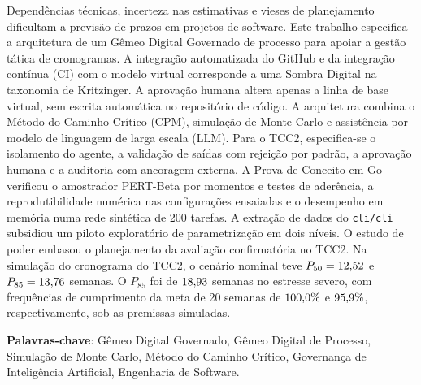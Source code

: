 \documentclass[12pt,openany,oneside,a4paper,english,brazilian,sumario=tradicional]{abntex2}
\begin{document}
\begin{resumo}
Dependências técnicas, incerteza nas estimativas e vieses de planejamento dificultam a previsão de prazos em projetos de software. Este trabalho especifica a arquitetura de um Gêmeo Digital Governado de processo para apoiar a gestão tática de cronogramas. A integração automatizada do GitHub e da integração contínua (CI) com o modelo virtual corresponde a uma Sombra Digital na taxonomia de Kritzinger. A aprovação humana altera apenas a linha de base virtual, sem escrita automática no repositório de código. A arquitetura combina o Método do Caminho Crítico (CPM), simulação de Monte Carlo e assistência por modelo de linguagem de larga escala (LLM). Para o TCC2, especifica-se o isolamento do agente, a validação de saídas com rejeição por padrão, a aprovação humana e a auditoria com ancoragem externa. A Prova de Conceito em Go verificou o amostrador PERT-Beta por momentos e testes de aderência, a reprodutibilidade numérica nas configurações ensaiadas e o desempenho em memória numa rede sintética de 200 tarefas. A extração de dados do \texttt{cli/cli} subsidiou um piloto exploratório de parametrização em dois níveis. O estudo de poder embasou o planejamento da avaliação confirmatória no TCC2. Na simulação do cronograma do TCC2, o cenário nominal teve $P_{50}=12{,}52{}$ e $P_{85}=13{,}76{}$ semanas. O $P_{85}$ foi de $18{,}93{}$ semanas no estresse severo, com frequências de cumprimento da meta de 20 semanas de $100{,}0{}\%$ e $95{,}9{}\%$, respectivamente, sob as premissas simuladas.

\textbf{Palavras-chave}: Gêmeo Digital Governado, Gêmeo Digital de Processo, Simulação de Monte Carlo, Método do Caminho Crítico, Governança de Inteligência Artificial, Engenharia de Software.
\end{resumo}
\end{document}
